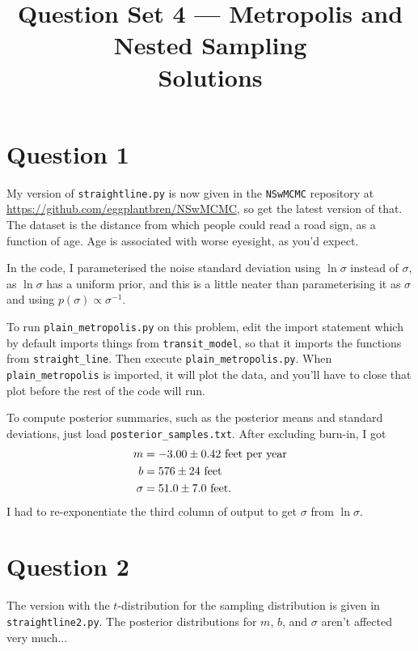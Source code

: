 \documentclass[a4paper, 12pt]{article}
\title{Question Set 4 --- Metropolis and Nested Sampling\\Solutions}
\author{}
\date{}
\begin{document}
\maketitle


\setlength{\parindent}{0pt}
\setlength{\parskip}{8pt}

\section*{Question 1}
My version of {\tt straightline.py} is now given in the {\tt NSwMCMC} repository
at \url{https://github.com/eggplantbren/NSwMCMC}, so get the latest version of that.
The dataset is the distance from which people could read a road sign, as a function
of age. Age is associated with worse eyesight, as you'd expect.

In the code, I parameterised the noise standard deviation using $\ln \sigma$
instead of $\sigma$, as $\ln \sigma$ has a uniform prior, and this is a little
neater than parameterising it as $\sigma$ and using $p(\sigma) \propto \sigma^{-1}$.

To run {\tt plain\_metropolis.py} on this problem, edit the import statement
which by default imports things from {\tt transit\_model}, so that it imports
the functions from {\tt straight\_line}. Then execute {\tt plain\_metropolis.py}.
When {\tt plain\_metropolis} is imported, it will plot the data, and you'll have
to close that plot before the rest of the code will run.

To compute posterior summaries, such as the posterior means and standard deviations,
just load {\tt posterior\_samples.txt}. After excluding burn-in, I got
\begin{align}
m &= -3.00 \pm 0.42\textnormal{ feet per year} \\
b &= 576 \pm 24\textnormal{ feet} \\
\sigma &= 51.0 \pm 7.0\textnormal{ feet}.
\end{align}
I had to re-exponentiate the third column of output to get $\sigma$ from
$\ln \sigma$.

\section*{Question 2}
The version with the $t$-distribution for the sampling distribution is given in
{\tt straightline2.py}. The posterior distributions for $m$, $b$, and $\sigma$
aren't affected very much...
\end{document}

